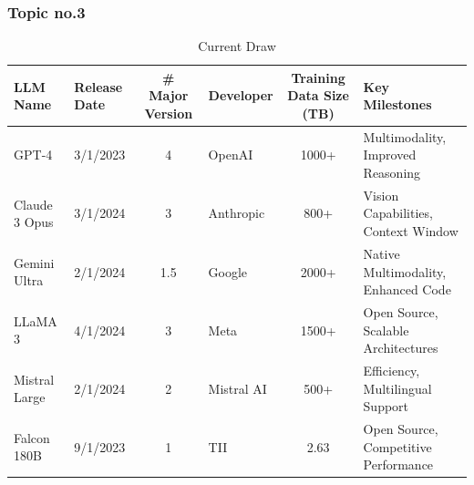 \documentclass[11pt,letterpaper]{article}
\begin{document}
\subsubsection{Topic no.3}
\begin{table}[H]
\fontsize{11}{11}\selectfont
\centering
\caption*{Current Draw}
\vspace{-7pt}
\begin{tabularx}{\textwidth}{l|l|c|l|c|X}
\toprule
\textbf{LLM Name} & \textbf{Release Date} & \textbf{\# Major Version} & \textbf{Developer} & \textbf{Training Data Size (TB)} & \textbf{Key Milestones} \\
\midrule
GPT-4 & 3/1/2023 & 4 & OpenAI & 1000+ & Multimodality, Improved Reasoning \\
Claude 3 Opus & 3/1/2024 & 3 & Anthropic & 800+ & Vision Capabilities, Context Window \\
Gemini Ultra & 2/1/2024 & 1.5 & Google & 2000+ & Native Multimodality, Enhanced Code \\
LLaMA 3 & 4/1/2024 & 3 & Meta & 1500+ & Open Source, Scalable Architectures \\
Mistral Large & 2/1/2024 & 2 & Mistral AI & 500+ & Efficiency, Multilingual Support \\
Falcon 180B & 9/1/2023 & 1 & TII & 2.63 & Open Source, Competitive Performance \\
\midrule
\bottomrule
\end{tabularx}
\end{table}
\newpage
\end{document}

